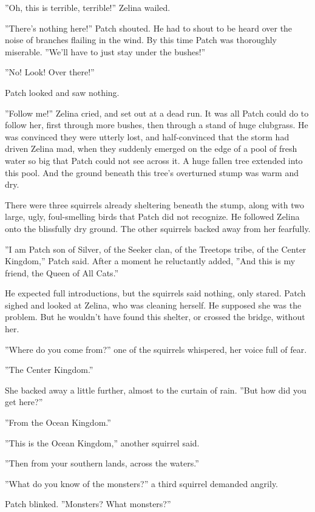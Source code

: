 \documentclass[12pt]{book}
\begin{document}
 ''Oh, this is terrible, terrible!'' Zelina wailed.\par
 ''There's nothing here!'' Patch shouted. He had to shout to be heard over the noise of branches flailing in the wind. By this time Patch was thoroughly miserable. ''We'll have to just stay under the bushes!''\par
 ''No! Look! Over there!''\par
 Patch looked and saw nothing.\par
 ''Follow me!'' Zelina cried, and set out at a dead run. It was all Patch could do to follow her, first through more bushes, then through a stand of huge clubgrass. He was convinced they were utterly lost, and half-convinced that the storm had driven Zelina mad, when they suddenly emerged on the edge of a pool of fresh water so big that Patch could not see across it. A huge fallen tree extended into this pool. And the ground beneath this tree's overturned stump was warm and dry.\par
 There were three squirrels already sheltering beneath the stump, along with two large, ugly, foul-smelling birds that Patch did not recognize. He followed Zelina onto the blissfully dry ground. The other squirrels backed away from her fearfully.\par
 ''I am Patch son of Silver, of the Seeker clan, of the Treetops tribe, of the Center Kingdom,'' Patch said. After a moment he reluctantly added, ''And this is my friend, the Queen of All Cats.''\par
 He expected full introductions, but the squirrels said nothing, only stared. Patch sighed and looked at Zelina, who was cleaning herself. He supposed she was the problem. But he wouldn't have found this shelter, or crossed the bridge, without her.\par
 ''Where do you come from?'' one of the squirrels whispered, her voice full of fear.\par
 ''The Center Kingdom.''\par
 She backed away a little further, almost to the curtain of rain. ''But how did you get here?''\par
 ''From the Ocean Kingdom.''\par
 ''This is the Ocean Kingdom,'' another squirrel said.\par
 ''Then from your southern lands, across the waters.''\par
 ''What do you know of the monsters?'' a third squirrel demanded angrily.\par
 Patch blinked. ''Monsters? What monsters?''\par
\end{document}
